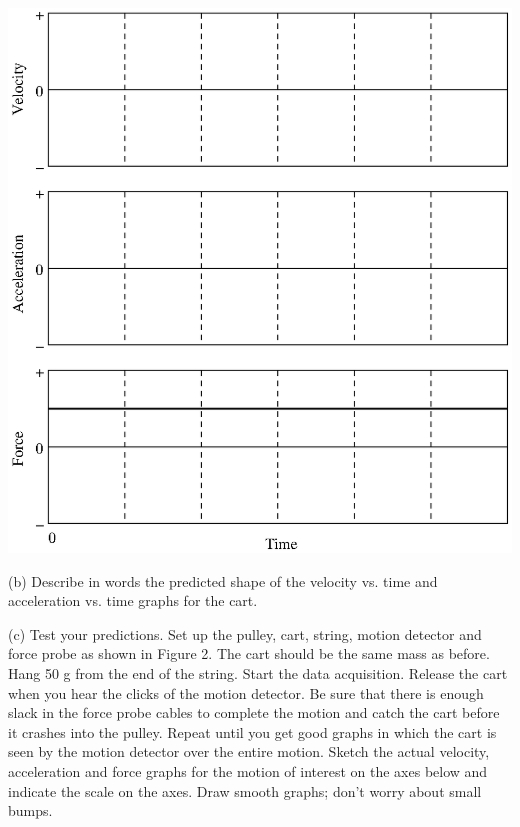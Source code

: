 \vspace{0.3cm}
{\par\centering \includegraphics{force1_fig3.eps} \par}
\vspace{0.3cm}

(b) Describe in words the predicted shape of the velocity vs. time and acceleration
vs. time graphs for the cart.
\vspace{20mm}

\newpage

(c) Test your predictions. Set up the pulley, cart, string, motion detector
and force probe as shown in Figure 2. The cart should be the same mass as before. Hang 50 g from the end of the string. Start the data acquisition.
Release the cart when you hear the clicks of the motion detector. Be sure that
there is enough slack in the force probe cables to complete the motion and catch
the cart before it crashes into the pulley. Repeat until you get good graphs
in which the cart is seen by the motion detector over the entire motion. Sketch
the actual velocity, acceleration and force graphs for the motion of interest
on the axes below and indicate the scale on the axes. Draw smooth graphs; don't
worry about small bumps.

